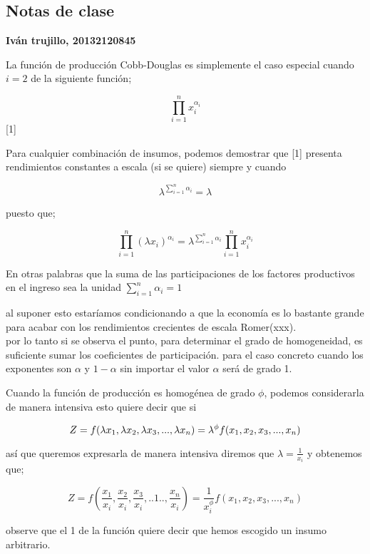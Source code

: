 \documentclass[12pt]{article}
\begin{document}
\subsection*{Notas de clase}{\bf{Iván trujillo, 20132120845}}

\vspace*{0,9cm}


La función de producción Cobb-Douglas es simplemente el caso especial cuando $i=2$ de la siguiente función;

$$\prod_{i=1}^n x_i^{\alpha_i}  $$ [1]

Para cualquier combinación de insumos, podemos demostrar que [1] presenta rendimientos constantes a escala (si se quiere) siempre y cuando 

 $$ \lambda^{\sum_{i=1}^n\alpha{_i}}=\lambda $$
 
 
puesto que; 



$$\prod_{i=1}^n \left(\lambda x_i \right)^{\alpha_i}=\lambda^{{\sum_{i=1}^n\alpha_i}}\prod_{i=1}^n x_i^{\alpha_i}$$
 
 
 
 
 En otras palabras que la suma de las participaciones de los factores productivos en el ingreso sea la unidad $\sum_{i=1}^n\alpha{_i}=1$
 
 al suponer esto estaríamos condicionando a que la economía es lo bastante grande para acabar con los rendimientos crecientes de escala Romer(xxx).
\\ 
 
 por lo tanto si se observa el punto, para determinar el grado de homogeneidad, es suficiente sumar los coeficientes de participación.
para el caso concreto cuando los exponentes son $\alpha$ y $1-\alpha$ sin importar el valor $\alpha$ será de grado 1. 

Cuando la función de producción es homogénea de grado $\phi$, podemos considerarla de manera intensiva esto quiere decir que si

 
$$Z=f(\lambda x_1,\lambda x_2,\lambda x_3,...,\lambda x_n)\\ =
\lambda^{\phi}f(x_1,x_2,x_3,...,x_n) $$

así que queremos expresarla de manera intensiva diremos que $\lambda=\frac{1}{x_{i}}$
y obtenemos que;


$$Z=f( \dfrac{x_1}{x_i},\dfrac{x_2}{x_i},\dfrac{x_3}{x_i},..1..,\dfrac{x_n}{x_i}) =
\dfrac{1}{x_i^{\phi}}f(x_1,x_2,x_3,...,x_n) $$

observe que el 1 de la función quiere decir que hemos escogido un insumo arbitrario. 
\end{document}
